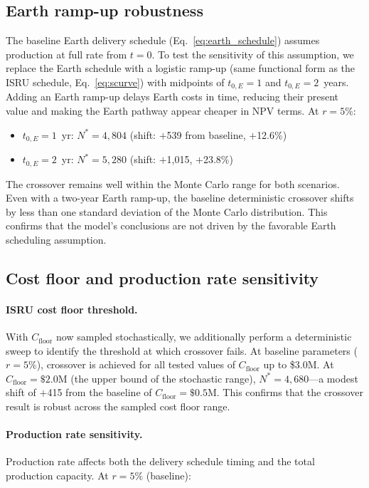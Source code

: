 \documentclass[preprint,12pt]{elsarticle}
\begin{document}
\subsection{Earth ramp-up robustness}
\label{sec:earth_ramp}

The baseline Earth delivery schedule (Eq.~\ref{eq:earth_schedule}) assumes production at full rate from $t = 0$. To test the sensitivity of this assumption, we replace the Earth schedule with a logistic ramp-up (same functional form as the ISRU schedule, Eq.~\ref{eq:scurve}) with midpoints of $t_{0,E} = 1$ and $t_{0,E} = 2$~years. Adding an Earth ramp-up delays Earth costs in time, reducing their present value and making the Earth pathway appear cheaper in NPV terms. At $r = 5\%$:

\begin{itemize}
\item $t_{0,E} = 1$~yr: $N^* = 4{,}804$ (shift: $+$539 from baseline, $+$12.6\%)
\item $t_{0,E} = 2$~yr: $N^* = 5{,}280$ (shift: $+$1{,}015, $+$23.8\%)
\end{itemize}

The crossover remains well within the Monte Carlo range for both scenarios. Even with a two-year Earth ramp-up, the baseline deterministic crossover shifts by less than one standard deviation of the Monte Carlo distribution. This confirms that the model's conclusions are not driven by the favorable Earth scheduling assumption.

\subsection{Cost floor and production rate sensitivity}
\label{sec:cfloor_prodrate}

\paragraph{ISRU cost floor threshold.} With $C_{\mathrm{floor}}$ now sampled stochastically, we additionally perform a deterministic sweep to identify the threshold at which crossover fails. At baseline parameters ($r = 5\%$), crossover is achieved for all tested values of $C_{\mathrm{floor}}$ up to \$3.0M. At $C_{\mathrm{floor}} = \$2.0$M (the upper bound of the stochastic range), $N^* = 4{,}680$---a modest shift of $+$415 from the baseline of $C_{\mathrm{floor}} = \$0.5$M. This confirms that the crossover result is robust across the sampled cost floor range.

\paragraph{Production rate sensitivity.} Production rate affects both the delivery schedule timing and the total production capacity. At $r = 5\%$ (baseline):
\end{document}
